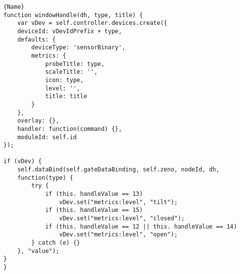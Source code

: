 \begin{lstlisting}[caption=Handle Device]{Name} 
function windowHandle(dh, type, title) {
	var vDev = self.controller.devices.create({
	deviceId: vDevIdPrefix + type,
	defaults: {
		deviceType: 'sensorBinary',
		metrics: {
			probeTitle: type,
			scaleTitle: '',
			icon: type,
			level: '',
			title: title
		}
	},
	overlay: {},
	handler: function(command) {},
	moduleId: self.id
});

if (vDev) {
	self.dataBind(self.gateDataBinding, self.zeno, nodeId, dh, 
	function(type) {
		try {
			if (this. handleValue == 13)
				vDev.set("metrics:level", "tilt");
			if (this. handleValue == 15)
				vDev.set("metrics:level", "closed");
			if (this. handleValue == 12 || this. handleValue == 14)
				vDev.set("metrics:level", "open");
		} catch (e) {}
	}, "value");
}
}
\end{lstlisting}